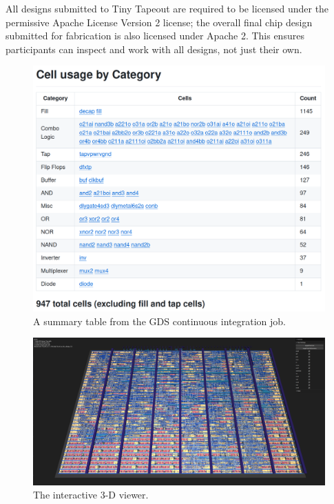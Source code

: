 All designs submitted to Tiny Tapeout are required to be licensed under the permissive Apache License Version 2\cite{apache} license; the overall final chip design submitted for fabrication is also licensed under Apache 2. This ensures participants can inspect and work with all designs, not just their own.

\begin{figure}[!t]
\centering
\includegraphics[width=\columnwidth]{./Figs/gh action cell stats.png}
\caption{A summary table from the GDS continuous integration job.}
\label{fig:summary_table_GDS_job}
\end{figure}

\begin{figure}[!t]
\centering
\includegraphics[width=\columnwidth]{./Figs/gh action gds 3d view.png}
\caption{The interactive 3-D viewer.}
\label{fig:interactive_3D_viewer}
\end{figure}
